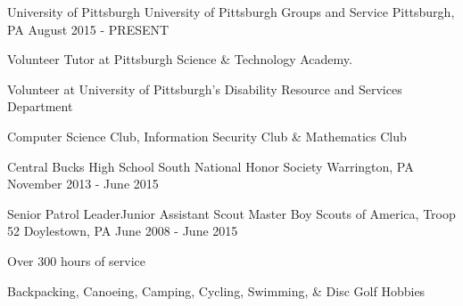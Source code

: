 
\vspace{-1mm}
\begin{cventries}

  \cventry
    {University of Pittsburgh} %
    {University of Pittsburgh Groups and Service} %
    {Pittsburgh, PA} %
    {August 2015 - PRESENT} %
    {
      \begin{cvitems} %
        \item {Volunteer Tutor at Pittsburgh Science \& Technology Academy.}
        \item {Volunteer at University of Pittsburgh’s Disability Resource and Services Department}
        \item {Computer Science Club, Information Security Club \& Mathematics Club}
      \end{cvitems}
    }

  \cventrywork
    {Central Bucks High School South} %
    {National Honor Society} %
    {Warrington, PA} %
    {November 2013 - June 2015} %

  \vspace{1mm}

  \cventry
    {Senior Patrol Leader{\enskip\cdotp\enskip}Junior Assistant Scout Master} %
    {Boy Scouts of America, Troop 52} %
    {Doylestown, PA} %
    {June 2008 - June 2015} %
    {
      \begin{cvitems} %
        \item {Over 300 hours of service}
      \end{cvitems}
    }

  \vspace{1mm}

  \cventrywork
    {Backpacking, Canoeing, Camping, Cycling, Swimming, \& Disc Golf} %
    {Hobbies} %
    {} %
    {} %

  \vspace{-5mm}

\end{cventries}
